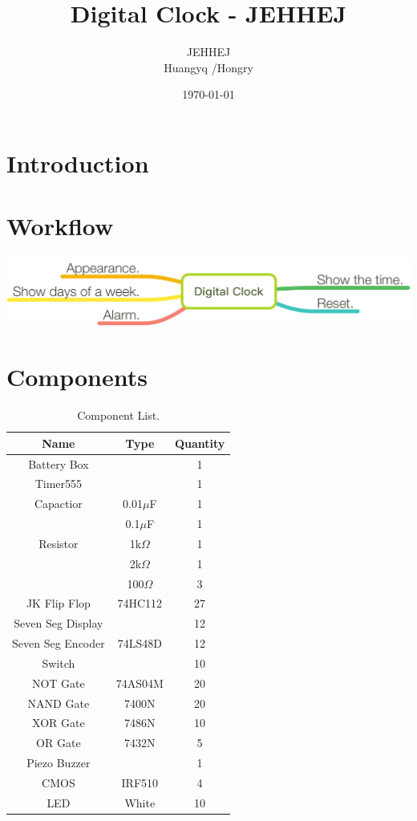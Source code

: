\documentclass[12pt]{article}
\title{Digital Clock - JEHHEJ}
\author{JEHHEJ\\ Huangyq /Hongry }
\date{\today}
\begin{document}
\maketitle

\tableofcontents
\clearpage

\section{Introduction}

\section{Workflow}
\includegraphics[scale=0.75]{workflow}

\section{Components}
\begin{table}[!h]
\centering
\caption{Component List.}
\begin{tabular}{ccc}
\toprule
Name & Type  & Quantity \\
\midrule
 Battery Box  &    & 1  \\
 Timer555 &   & 1 \\
 Capactior  & 0.01$\mu$F   & 1  \\
     & 0.1$\mu$F  & 1 \\
Resistor & 1k$\Omega$  & 1 \\
     &  2k$\Omega$ & 1 \\
     &  100$\Omega$ & 3 \\
JK Flip Flop   & 74HC112  & 27 \\
Seven Seg Display  &    & 12  \\
Seven Seg Encoder&  74LS48D  & 12  \\
Switch  &    & 10  \\
NOT Gate  & 74AS04M & 20  \\
NAND Gate  & 7400N & 20  \\
XOR Gate  & 7486N & 10  \\
OR Gate  & 7432N & 5  \\
Piezo Buzzer & & 1  \\
CMOS & IRF510 & 4  \\
LED & White & 10  \\

\bottomrule
\end{tabular}
\end{table}
\end{document}
